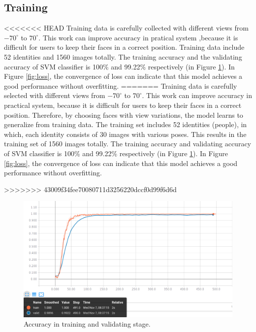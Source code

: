 \documentclass[journal, twocolumn]{IEEEtran}
\begin{document}
\subsection{Training}
<<<<<<< HEAD
Training data is carefully collected with different views from $-70^\circ$ to $70^\circ$. This work can improve accuracy in pratical system ,because it is difficult for users to keep their faces in a correct position. Training data include 52 identities and 1560 images totally. The training accuracy and the validating accuracy of SVM classifier is 100\% and 99.22\% respectively (in Figure \ref{fig:acc}). In Figure \ref{fig:loss}, the convergence of loss can indicate that this model achieves a good performance without overfitting. 
=======
Training data is carefully selected with different views from $-70^\circ$ to $70^\circ$. This work can improve accuracy in practical system, because it is difficult for users to keep their faces in a correct position. Therefore, by choosing faces with view variations, the model learns to generalize from training data. The training set includes 52 identities (people), in which, each identity consists of 30 images with various poses. This results in the training set of 1560 images totally. The training accuracy and validating accuracy of SVM classifier is 100\% and 99.22\% respectively (in Figure \ref{fig:acc}). In Figure \ref{fig:loss}, the convergence of loss can indicate that this model achieves a good performance without overfitting.


>>>>>>> 43009f34fee70080711d3256220dccf0d99f6d6d
\begin{figure}
    \centering
    \includegraphics[width=1\linewidth]{img/acc.png}
	\caption{Accuracy in training and validating stage.}
	\label{fig:acc}
\end{figure}
\end{document}
